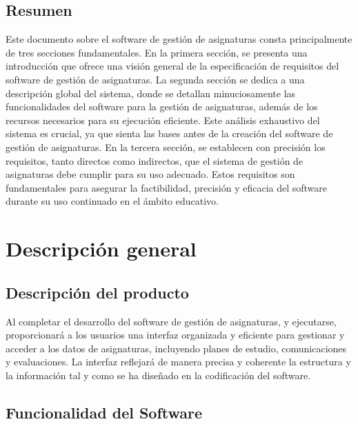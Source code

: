 \documentclass[11pt]{article}
\begin{document}
\subsection{\textbf{Resumen}}

Este documento sobre el software de gestión de asignaturas consta 
principalmente de tres secciones fundamentales. En la primera
sección, se presenta una introducción que ofrece una visión general
de la especificación de requisitos del software de gestión de 
asignaturas.
La segunda sección se dedica a una descripción global del sistema,
donde se detallan minuciosamente las funcionalidades del software
para la gestión de asignaturas, además de los recursos necesarios
para su ejecución eficiente. Este análisis exhaustivo del sistema es
crucial, ya que sienta las bases antes de la creación del software 
de gestión de asignaturas.
En la tercera sección, se establecen con precisión los requisitos, 
tanto directos como indirectos, que el sistema de gestión de 
asignaturas debe cumplir para su uso adecuado. Estos requisitos son 
fundamentales para asegurar la factibilidad, precisión y eficacia
del software durante su uso continuado en el ámbito educativo.

\section{\textbf{Descripción general}}

\subsection{\textbf{Descripción del producto}}

Al completar el desarrollo del software de gestión de asignaturas, y
ejecutarse, proporcionará a los usuarios una interfaz organizada y
eficiente para gestionar y acceder a los datos de asignaturas, 
incluyendo planes de estudio, comunicaciones y evaluaciones. La 
interfaz reflejará de manera precisa y coherente la estructura y la 
información tal y como se ha diseñado en la codificación del 
software.

\subsection{\textbf{Funcionalidad del Software}}
\end{document}
